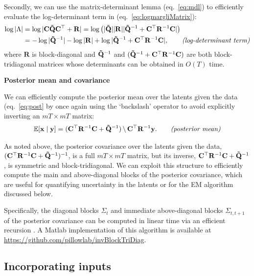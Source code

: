 \documentclass[10pt]{article}
\newcommand{\vx}{\mathbf{x}}
\newcommand{\vy}{\mathbf{y}}
\newcommand{\tmQ}{\mathbf{\tilde Q}}
\newcommand{\mR}{\mathbf{R}}
\newcommand{\mC}{\mathbf{C}}
\begin{document}
\begin{appendices}
Secondly, we can use the matrix-determinant lemma (eq.~\ref{eq:mdl})
to efficiently evaluate the log-determinant term in
(eq.~\ref{eq:logmargliMatrix}):
\begin{align}
  \label{eq:5}
  \log |\Lambda| &= \log |\mC \tmQ \mC\trp + \mR| = \log \left(|\tmQ| |\mR| | 
                   \tmQ\inv + \mC\trp \mR\inv   \mC
                   | \right) \nonumber \\
  &= - \log |\tmQ\inv | - \log |\mR| + \log |
    \tmQ\inv + \mC\trp \mR\inv \mC|,
     \qquad \text{\it (log-determinant term)}
\end{align}
where $\mR$ is block-diagonal and $\tmQ\inv$ and $(\tmQ\inv  +
\mC\trp\mR\inv \mC)$ are both block-tridiagonal matrices whose determinants can
be obtained in $O(T)$ time.

\textbf{Posterior mean and covariance}

We can efficiently compute the posterior mean over the latents given
the data (eq.~\ref{eq:post} by once again using the `backslash'
operator to avoid explicitly inverting an $mT \times mT$ matrix:
\begin{equation}
  \label{eq:postmean}
  \E[\vx \mid \vy] = (\mC\trp \mR\inv \mC + \tmQ\inv)\, \backslash\,
  \mC\trp \mR\inv \vy. \qquad \text{\it (posterior mean)}
\end{equation}


As noted above, the posterior covariance over the latents given the
data, $(\mC\trp \mR\inv \mC + \tmQ\inv)\inv$, is a full $mT \times mT$
matrix, but its inverse, $\mC\trp \mR\inv \mC + \tmQ\inv$, is
symmetric and block-tridiagonal.  We can exploit this structure to
efficiently compute the main and above-diagonal blocks of the
posterior covariance, which are useful for quantifying uncertainty in
the latents or for the EM algorithm discussed below.

Specifically, the diagonal blocks $\Sigma_t$ and immediate above-diagonal
blocks $\Sigma_{t,t+1}$ of the posterior covariance %
can be computed in linear time via an efficient recursion
\cite{Rybicki91}.  A Matlab implementation of this algorithm is
available at \url{https://github.com/pillowlab/invBlockTriDiag}.


\subsection{Incorporating inputs}


\end{appendices}
\end{document}
